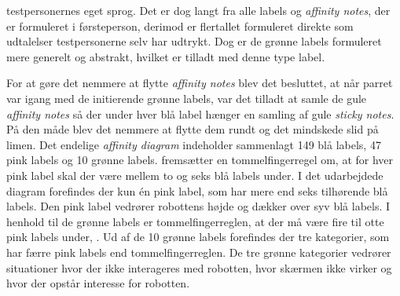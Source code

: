 testpersonernes eget sprog. Det er dog langt fra alle labels og \textit{affinity notes}, der er formuleret i førsteperson, derimod er flertallet formuleret direkte som udtalelser testpersonerne selv har udtrykt. Dog er de grønne labels formuleret mere generelt og abstrakt, hvilket er tilladt med denne type label.  

For at gøre det nemmere at flytte \textit{affinity notes} blev det besluttet, at når parret var igang med de initierende grønne labels, var det tilladt at samle de gule \textit{affinity notes} så der under hver blå label hænger en samling af gule \textit{sticky notes}. På den måde blev det nemmere at flytte dem rundt og det mindskede slid på limen. Det endelige \textit{affinity diagram} indeholder sammenlagt 149 blå labels, 47 pink labels og 10 grønne labels. \textcite[s. 174]{Book:BuildingAnAffinity} fremsætter en tommelfingerregel om, at for hver pink label skal der være mellem to og seks blå labels under. I det udarbejdede diagram forefindes der kun én pink label, som har mere end seks tilhørende blå labels. Den pink label vedrører robottens højde og dækker over syv blå labels. I henhold til de grønne labels er tommelfingerreglen, at der må være fire til otte pink labels under, \parencite[s. 174]{Book:BuildingAnAffinity}. Ud af de 10 grønne labels forefindes der tre kategorier, som har færre pink labels end tommelfingerreglen. De tre grønne kategorier vedrører situationer hvor der ikke interageres med robotten, hvor skærmen ikke virker og hvor der opstår interesse for robotten.  
